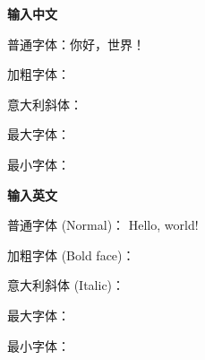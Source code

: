 \documentclass{ctexart}
\begin{document}
\textbf{输入中文}

普通字体：你好，世界！

加粗字体：

意大利斜体：

最大字体：

最小字体：

\textbf{输入英文}

普通字体 (Normal)： Hello, world!

加粗字体 (Bold face)：

意大利斜体 (Italic)：

最大字体：

最小字体：
\end{document}
